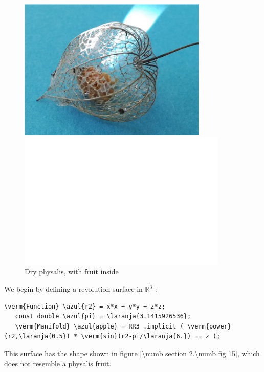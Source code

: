 \begin{figure}[ht]\centering
\if{}
\centerline{\includegraphics[width=90mm]{dry-physalis}}
\else
{}
\centerline{\includegraphics[width=100mm]{fake-physalis}}
\fi
  \caption{Dry physalis, with fruit inside}\label{\numb section 2.\numb fig 14}
\end{figure}

We begin by defining a revolution surface in $ \mathbb{R}^3 $ :

\begin{Verbatim}[commandchars=\\\{\},formatcom=\small\tt,frame=single,
   label=parag-\ref{\numb section 2.\numb parag 14}.cpp,rulecolor=\color{moldura},
   baselinestretch=0.94,framesep=2mm]
   \verm{Function} \azul{r2} = x*x + y*y + z*z;
   const double \azul{pi} = \laranja{3.1415926536};
   \verm{Manifold} \azul{apple} = RR3 .implicit ( \verm{power}(r2,\laranja{0.5}) * \verm{sin}(r2-pi/\laranja{6.}) == z );
\end{Verbatim}

This surface has the shape shown in figure \ref{\numb section 2.\numb fig 15},
which does not resemble a physalis fruit.


